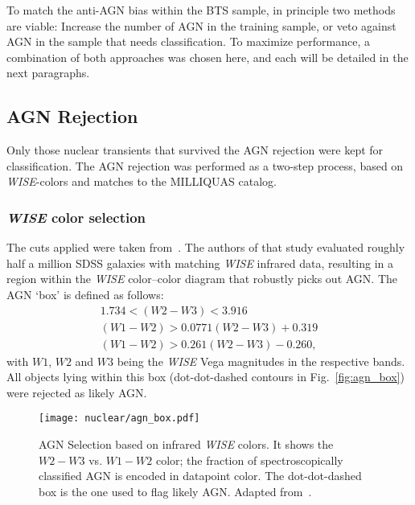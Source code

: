 To match the anti-AGN bias within the BTS sample, in principle two methods are viable: Increase the number of AGN in the training sample, or veto against AGN in the sample that needs classification. To maximize performance, a combination of both approaches was chosen here, and each will be detailed in the next paragraphs.

\subsection{AGN Rejection}\label{agn_rejection}
Only those nuclear transients that survived the AGN rejection were kept for classification. The AGN rejection was performed as a two-step process, based on \textit{WISE}-colors and matches to the MILLIQUAS catalog.

\subsubsection{\textit{WISE} color selection}\label{wise_color_cut}
The cuts applied were taken from~\cite{Hviding2022}. The authors of that study evaluated roughly half a million SDSS galaxies with matching \textit{WISE} infrared data, resulting in a region within the \textit{WISE} color--color diagram that robustly picks out AGN. The AGN `box' is defined as follows:
\begin{subequations}
  \begin{eqnarray}
    1.734 < (\textit{W2}-\textit{W3}) < 3.916 \\
    (\textit{W1}-\textit{W2}) > 0.0771 (\textit{W2}-\textit{W3}) + 0.319 \\
    (\textit{W1}-\textit{W2}) > 0.261 (\textit{W2}-\textit{W3}) - 0.260,
  \end{eqnarray}
\end{subequations}
with $W1$, $W2$ and $W3$ being the \textit{WISE} Vega magnitudes in the respective bands. All objects lying within this box (dot-dot-dashed contours in Fig.~\ref{fig:agn_box}) were rejected as likely AGN.

\begin{figure}[htpb]
  \texttt{[image: nuclear/agn\_box.pdf]}
  \caption[Infrared AGN selection]{AGN Selection based on infrared \textit{WISE} colors. It shows the $W2-W3$ vs. $W1-W2$ color; the fraction of spectroscopically classified AGN is encoded in datapoint color. The dot-dot-dashed box is the one used to flag likely AGN. Adapted from~\cite{Hviding2022}.}
\end{figure}

